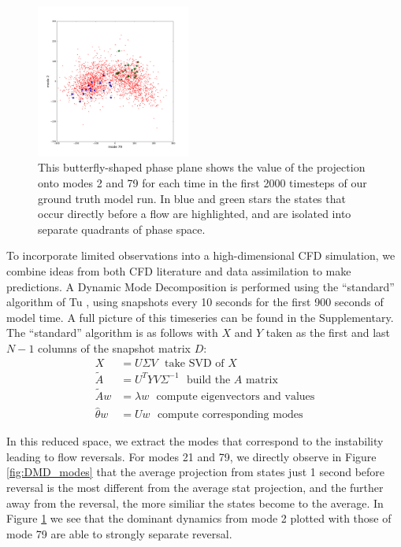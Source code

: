 \begin{figure}[t]
  \centering
  \includegraphics[width=0.45\textwidth]{../figures/DMD/DMD_mode_2_79_phaseplane-003.png}
  \caption[]{
    This butterfly-shaped phase plane shows the value of the projection onto modes 2 and 79 for each time in the first 2000 timesteps of our ground truth model run.
    In blue and green stars the states that occur directly before a flow are highlighted, and are isolated into separate quadrants of phase space.
  }
  \label{fig:DMD_phaseplane}
\end{figure}

To incorporate limited observations into a high-dimensional CFD simulation, we combine ideas from both CFD literature and data assimilation to make predictions.
A Dynamic Mode Decomposition is performed using the ``standard'' algorithm of Tu , using snapshots every 10 seconds for the first 900 seconds of model time.
A full picture of this timeseries can be found in the Supplementary.
The ``standard'' algorithm is as follows with $X$ and $Y$ taken as the first and last $N-1$ columns of the snapshot matrix $D$:
\begin{align*} X &= U\Sigma V~~~ \text{take SVD of $X$}\\
  \tilde{A} &= U^T Y V \Sigma ^{-1}~~~ \text{build the $A$ matrix}\\
  \tilde{A}w &= \lambda w~~~ \text{compute eigenvectors and values}\\
  \hat{\theta}w &= U w~~~ \text{compute corresponding modes}\end{align*}

In this reduced space, we extract the modes that correspond to the instability leading to flow reversals.
For modes 21 and 79, we directly observe in Figure \ref{fig:DMD_modes} that the average projection from states just 1 second before reversal is the most different from the average stat projection, and the further away from the reversal, the more similiar the states become to the average.
In Figure \ref{fig:DMD_phaseplane} we see that the dominant dynamics from mode 2 plotted with those of mode 79 are able to strongly separate reversal.

